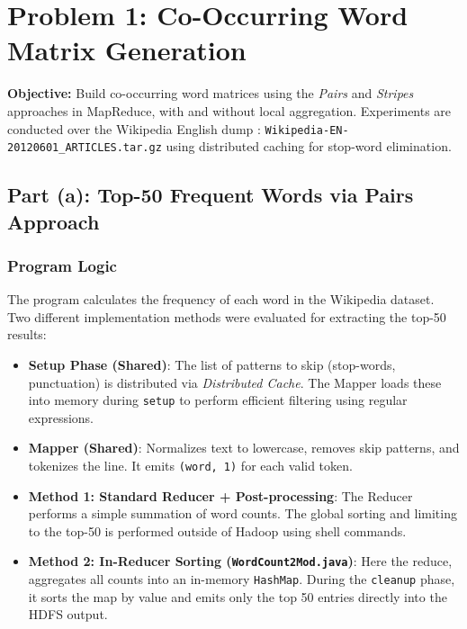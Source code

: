 \documentclass[12pt,a4paper]{article}
\begin{document}
\tableofcontents
\newpage

\section{Problem 1: Co-Occurring Word Matrix Generation}

\begin{infobox}
  \textbf{Objective:} Build co-occurring word matrices using the \textit{Pairs} and \textit{Stripes} approaches in MapReduce, with and without local aggregation. Experiments are conducted over the Wikipedia English dump : \texttt{Wikipedia-EN-20120601\_ARTICLES.tar.gz} using distributed caching for stop-word elimination.
\end{infobox}

\subsection{Part (a): Top-50 Frequent Words via Pairs Approach}

\subsubsection{Program Logic}

The program calculates the frequency of each word in the Wikipedia dataset. Two different implementation methods were evaluated for extracting the top-50 results:

\begin{itemize}
    \item \textbf{Setup Phase (Shared)}: The list of patterns to skip (stop-words, punctuation) is distributed via \textit{Distributed Cache}. The Mapper loads these into memory during \texttt{setup} to perform efficient filtering using regular expressions.
    \item \textbf{Mapper (Shared)}: Normalizes text to lowercase, removes skip patterns, and tokenizes the line. It emits \texttt{(word, 1)} for each valid token.
    \item \textbf{Method 1: Standard Reducer + Post-processing}: The Reducer performs a simple summation of word counts. The global sorting and limiting to the top-50 is performed outside of Hadoop using shell commands.
    \item \textbf{Method 2: In-Reducer Sorting (\texttt{WordCount2Mod.java})}: Here the reduce, aggregates all counts into an in-memory \texttt{HashMap}. During the \texttt{cleanup} phase, it sorts the map by value and emits only the top 50 entries directly into the HDFS output.
\end{itemize}
\end{document}
